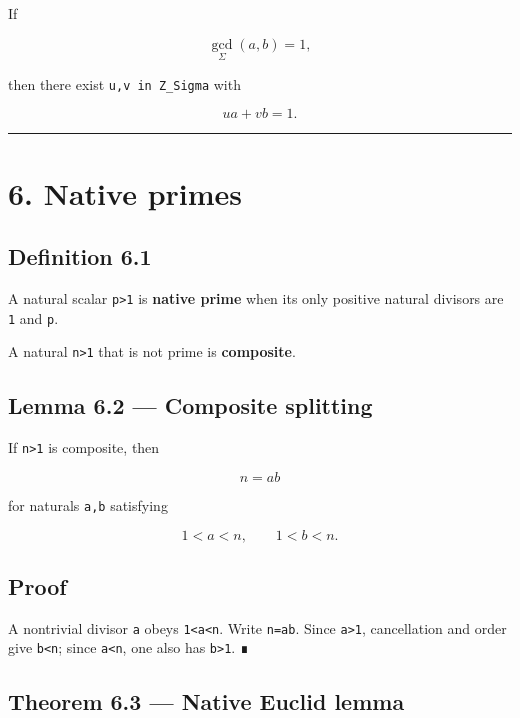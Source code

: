 If

\[
\gcd_\Sigma(a,b)=1,
\]

then there exist \texttt{u,v\ in\ Z\_Sigma} with

\[
ua+vb=1.
\]

\begin{center}\rule{0.5\linewidth}{0.5pt}\end{center}

\hypertarget{native-primes}{%
\section{6. Native primes}\label{native-primes}}

\hypertarget{definition-6.1}{%
\subsection{Definition 6.1}\label{definition-6.1}}

A natural scalar \texttt{p\textgreater{}1} is \textbf{native prime} when its only positive natural
divisors are \texttt{1} and \texttt{p}.

A natural \texttt{n\textgreater{}1} that is not prime is \textbf{composite}.

\hypertarget{lemma-6.2-composite-splitting}{%
\subsection{Lemma 6.2 --- Composite splitting}\label{lemma-6.2-composite-splitting}}

If \texttt{n\textgreater{}1} is composite, then

\[
n=ab
\]

for naturals \texttt{a,b} satisfying

\[
1<a<n,
\qquad
1<b<n.
\]

\hypertarget{proof-5}{%
\subsection{Proof}\label{proof-5}}

A nontrivial divisor \texttt{a} obeys \texttt{1\textless{}a\textless{}n}. Write \texttt{n=ab}. Since \texttt{a\textgreater{}1}, cancellation
and order give \texttt{b\textless{}n}; since \texttt{a\textless{}n}, one also has \texttt{b\textgreater{}1}. ∎

\hypertarget{theorem-6.3-native-euclid-lemma}{%
\subsection{Theorem 6.3 --- Native Euclid lemma}\label{theorem-6.3-native-euclid-lemma}}

